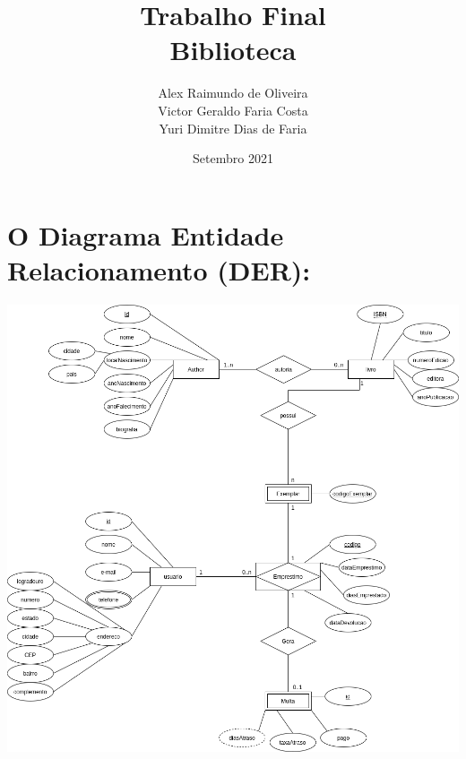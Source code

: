 \documentclass{article}
\title{Trabalho Final \\ Biblioteca}
\author{ Alex Raimundo de Oliveira \\ Victor Geraldo Faria Costa\\ Yuri Dimitre Dias de Faria}
\date{Setembro 2021}
\begin{document}
    
    \maketitle
\section*{O Diagrama Entidade Relacionamento (DER):}
\includegraphics[height=\hsize]{../docs/DER2.png}
\end{document}
